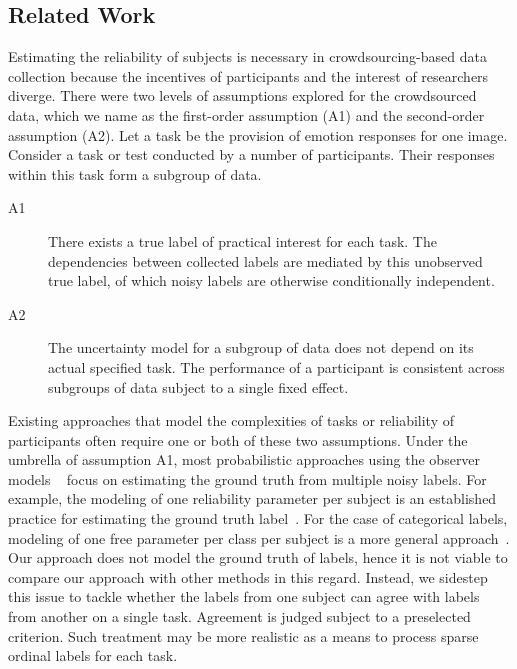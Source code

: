 \documentclass[10pt,journal,letterpaper,compsoc,twoside]{IEEEtran}
\begin{document}
\subsection{Related Work}
Estimating the reliability of subjects is necessary in 
crowdsourcing-based data collection because the incentives of participants and the interest of researchers diverge. 
There were two levels of assumptions explored for the crowdsourced data, 
which we name as the first-order
assumption (A1) and the second-order assumption (A2). Let a task be the provision of emotion responses for one image. Consider a task or test conducted by a number of participants. Their responses within this task form a subgroup of data. 
\begin{description}
\item [A1] There exists a true label of practical interest for each task.
 The dependencies between collected labels are mediated by this unobserved true label, 
 of which noisy labels are otherwise conditionally independent. 
\item [A2] The uncertainty model for a subgroup of data
does not depend on its actual specified task. 
The performance of a participant is consistent across subgroups of data subject to a single fixed effect.
\end{description}

Existing approaches that model the complexities of tasks or reliability of participants often require
 one or both of these two assumptions. Under the umbrella of assumption A1, most probabilistic 
 approaches using the observer models  ~\citep{dawid1979maximum,hui1980estimating,smyth1995inferring,demartini2012zencrowd}
 focus on estimating the ground truth from multiple noisy labels. For example,
 the modeling of one reliability parameter per subject is an established practice for estimating 
 the ground truth label~\cite{demartini2012zencrowd}. For the case of categorical
 labels, modeling of one free parameter per class per subject is a more general 
 approach~\cite{dawid1979maximum,raykar2010learning}.
 Our approach does not model the ground truth of labels, hence it is not viable to compare our approach with other methods in this regard. Instead, we sidestep this issue to tackle whether the labels from one subject can agree 
 with labels from another on a single task. 
 Agreement is judged subject to a preselected criterion.
Such treatment may be more realistic as a means to process sparse ordinal labels for each task. 
\end{document}
